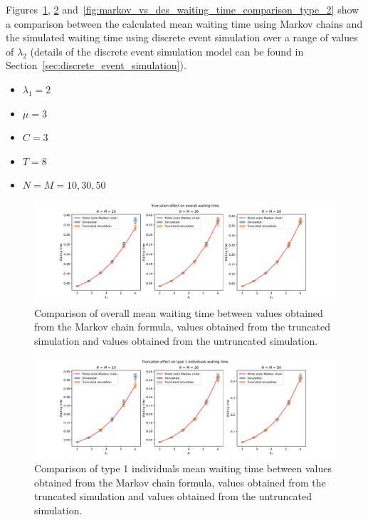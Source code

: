 Figures~\ref{fig:markov_vs_des_waiting_time_comparison_overall},
\ref{fig:markov_vs_des_waiting_time_comparison_type_1}
and~\ref{fig:markov_vs_des_waiting_time_comparison_type_2} show a
comparison between the calculated mean waiting time using Markov chains and the
simulated waiting time using discrete event simulation over a range of values of
\(\lambda_2\) (details of the discrete event simulation model can be found in
Section~\ref{sec:discrete_event_simulation}).

\begin{itemize}
    \item \(\lambda_1 = 2\)
    \item \(\mu = 3\)
    \item \(C = 3\)
    \item \(T = 8\)
    \item \(N = M = 10, 30, 50\)
\end{itemize}

\begin{figure}[H]
    \includegraphics[width=\textwidth]{chapters/03_queueing_model/Bin/numeric_results_and_timings/truncation_effect/waiting_time_overall.pdf}
    \caption{
        Comparison of overall mean waiting time between values obtained from the
        Markov chain formula, values obtained from the truncated simulation and
        values obtained from the untruncated simulation.
    }
    \label{fig:markov_vs_des_waiting_time_comparison_overall}
\end{figure}

\begin{figure}[H]
    \includegraphics[width=\textwidth]{chapters/03_queueing_model/Bin/numeric_results_and_timings/truncation_effect/waiting_time_type_1.pdf}
    \caption{
        Comparison of type 1 individuals mean waiting time between values
        obtained from the Markov chain formula, values obtained from the
        truncated simulation and values obtained from the untruncated
        simulation.
    }
    \label{fig:markov_vs_des_waiting_time_comparison_type_1}
\end{figure}

